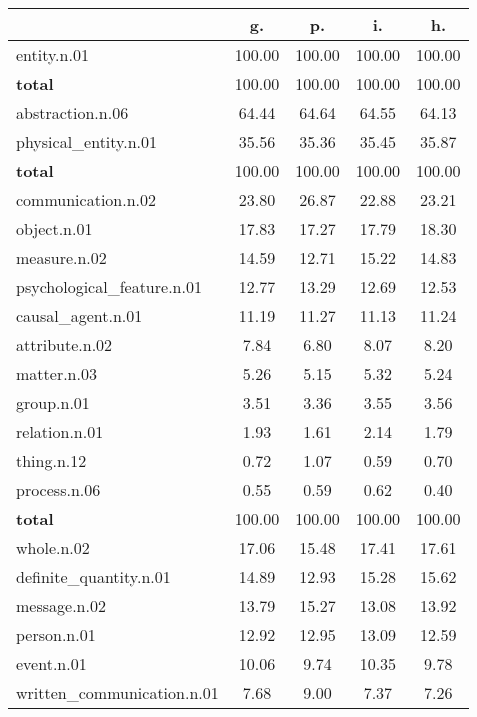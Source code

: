\begin{table}[h!]
\begin{center}
\begin{tabular}{| l || c | c | c | c |}\hline
 & {\bf g.} & {\bf p.} & {\bf i.} & {\bf h.} \\\hline\hline
entity.n.01 & 100.00  & 100.00  & 100.00  & 100.00 \\\hline\hline
{{\bf total}} & 100.00  & 100.00  & 100.00  & 100.00 \\\hline\hline\hline
abstraction.n.06 & 64.44  & 64.64  & 64.55  & 64.13 \\\hline
physical\_entity.n.01 & 35.56  & 35.36  & 35.45  & 35.87 \\\hline\hline
{{\bf total}} & 100.00  & 100.00  & 100.00  & 100.00 \\\hline\hline\hline
communication.n.02 & 23.80  & 26.87  & 22.88  & 23.21 \\\hline
object.n.01 & 17.83  & 17.27  & 17.79  & 18.30 \\\hline
measure.n.02 & 14.59  & 12.71  & 15.22  & 14.83 \\\hline
psychological\_feature.n.01 & 12.77  & 13.29  & 12.69  & 12.53 \\\hline
causal\_agent.n.01 & 11.19  & 11.27  & 11.13  & 11.24 \\\hline
attribute.n.02 & 7.84  & 6.80  & 8.07  & 8.20 \\\hline
matter.n.03 & 5.26  & 5.15  & 5.32  & 5.24 \\\hline
group.n.01 & 3.51  & 3.36  & 3.55  & 3.56 \\\hline
relation.n.01 & 1.93  & 1.61  & 2.14  & 1.79 \\\hline
thing.n.12 & 0.72  & 1.07  & 0.59  & 0.70 \\\hline
process.n.06 & 0.55  & 0.59  & 0.62  & 0.40 \\\hline\hline
{{\bf total}} & 100.00  & 100.00  & 100.00  & 100.00 \\\hline\hline\hline
whole.n.02 & 17.06  & 15.48  & 17.41  & 17.61 \\\hline
definite\_quantity.n.01 & 14.89  & 12.93  & 15.28  & 15.62 \\\hline
message.n.02 & 13.79  & 15.27  & 13.08  & 13.92 \\\hline
person.n.01 & 12.92  & 12.95  & 13.09  & 12.59 \\\hline
event.n.01 & 10.06  & 9.74  & 10.35  & 9.78 \\\hline
written\_communication.n.01 & 7.68  & 9.00  & 7.37  & 7.26 \\\hline

\end{tabular}
\end{center}
\end{table}

